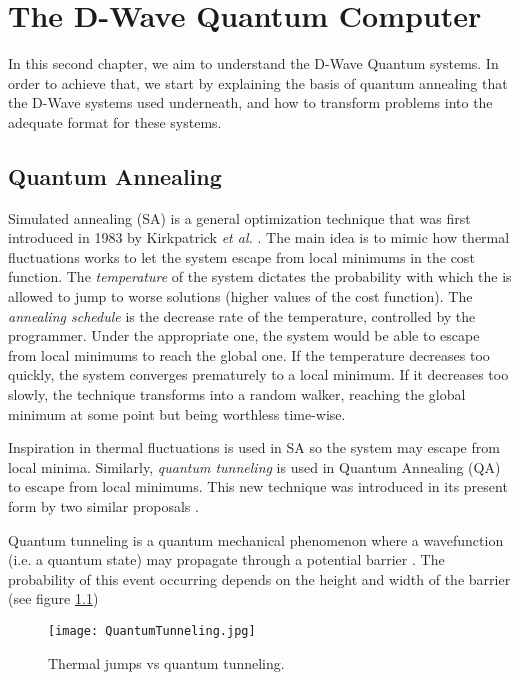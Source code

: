\chapter{The D-Wave Quantum Computer}


In this second chapter, we aim to understand the D-Wave Quantum systems. In order to achieve that, we start by explaining the basis of quantum annealing that the D-Wave systems used underneath, and how to transform problems into the adequate format for these systems.


\section{Quantum Annealing}


Simulated annealing (SA) is a general optimization technique that was first introduced in 1983 by Kirkpatrick \emph{et al.} \cite{Kirkpatrick1983}. The main idea is to mimic how thermal fluctuations works to let the system escape from local minimums in the cost function. The \emph{temperature} of the system dictates the probability with which the is allowed to jump to worse solutions (higher values of the cost function). The \emph{annealing schedule} is the decrease rate of the temperature, controlled by the programmer. Under the appropriate one, the system would be able to escape from local minimums to reach the global one. If the temperature decreases too quickly, the system converges prematurely to a local minimum. If it decreases too slowly, the technique transforms into a random walker, reaching the global minimum at some point but being worthless time-wise.

Inspiration in thermal fluctuations is used in SA so the system may escape from local minima. Similarly, \emph{quantum tunneling} is used in Quantum Annealing (QA) to escape from local minimums. This new technique was introduced in its present form by two similar proposals \cite{Finnila1994} \cite{Kadowaki1998}.

Quantum tunneling is a quantum mechanical phenomenon where a wavefunction (i.e. a quantum state) may propagate through a potential barrier \cite{Nimtz2008}. The probability of this event occurring depends on the height and width of the barrier (see figure \ref{fig 2.1})

\begin{figure}[h]
	\texttt{[image: QuantumTunneling.jpg]}
	\centering
	\caption{Thermal jumps vs quantum tunneling.}
	\label{fig 2.1}
\end{figure}

